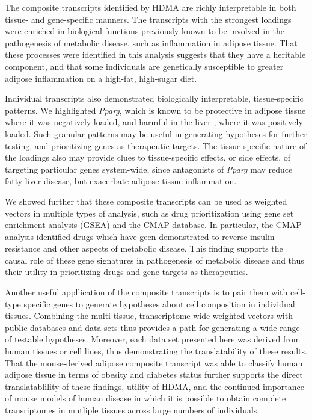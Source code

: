 \documentclass[
]{article}
\begin{document}
The composite transcripts identified by HDMA are richly interpretable in
both tissue- and gene-specific manners. The transcripts with the
strongest loadings were enriched in biological functions previously
known to be involved in the pathogenesis of metabolic disease, such as
inflammation in adipose tissue. That these processes were identified in
this analysis suggests that they have a heritable component, and that
some individuals are genetically susceptible to greater adipose
inflammation on a high-fat, high-sugar diet.

Individual transcripts also demonstrated biologically interpretable,
tissue-specific patterns. We highlighted \textit{Pparg}, which is known
to be protective in adipose tissue \cite{pmid17389767} where it was
negatively loaded, and harmful in the liver
\cite{pmid12805374, pmid12618528, 
pmid16357043, pmid15644454, pmid16403437}, where it was positively
loaded. Such granular patterns may be useful in generating hypotheses
for further testing, and prioritizing genes as therapeutic targets. The
tissue-specific nature of the loadings also may provide clues to
tissue-specific effects, or side effects, of targeting particular genes
system-wide, since antagonists of \textit{Pparg} may reduce fatty liver
disease, but exacerbate adipose tissue inflammation.

We showed further that these composite transcripts can be used as
weighted vectors in multiple types of analysis, such as drug
prioritization using gene set enrichment analysis (GSEA) and the CMAP
database. In particular, the CMAP analysis identified drugs which have
geen demonstrated to reverse insulin resistance and other aspects of
metabolic disease. This finding supports the causal role of these gene
signatures in pathogenesis of metabolic disease and thus their utility
in prioritizing drugs and gene targets as therapeutics.

Another useful appllication of the composite transcripts is to pair them
with cell-type specific genes to generate hypotheses about cell
composition in individual tissues. Combining the multi-tissue,
transcriptome-wide weighted vectors with public databases and data sets
thus provides a path for generating a wide range of testable hypotheses.
Moreover, each data set presented here was derived from human tissues or
cell lines, thus demonstrating the translatability of these results.
That the mouse-derived adipose composite transcript was able to classify
human adipose tissue in terms of obesity and diabetes status further
supports the direct translatablility of these findings, utility of HDMA,
and the continued importance of mouse models of human disease in which
it is possible to obtain complete transriptomes in mutliple tissues
across large numbers of individuals.
\end{document}
